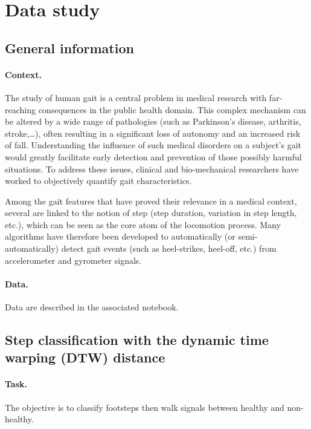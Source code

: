 \documentclass[11pt]{article}
\begin{document}
\section{Data study}

\subsection{General information}

\paragraph{Context.}
The study of human gait is a central problem in medical research with far-reaching consequences in the public health domain. This complex mechanism can be altered by a wide range of pathologies (such as Parkinson's disease, arthritis, stroke,\ldots), often resulting in a significant loss of autonomy and an increased risk of fall. Understanding the influence of such medical disorders on a subject's gait would greatly facilitate early detection and prevention of those possibly harmful situations. To address these issues, clinical and bio-mechanical researchers have worked to objectively quantify gait characteristics.

Among the gait features that have proved their relevance in a medical context, several are linked to the notion of step (step duration, variation in step length, etc.), which can be seen as the core atom of the locomotion process. Many algorithms have therefore been developed to automatically (or semi-automatically) detect gait events (such as heel-strikes, heel-off, etc.) from accelerometer and gyrometer signals.

\paragraph{Data.}
Data are described in the associated notebook.

\subsection{Step classification with the dynamic time warping (DTW) distance}

\paragraph{Task.} The objective is to classify footsteps then walk signals between healthy and non-healthy.
\end{document}
